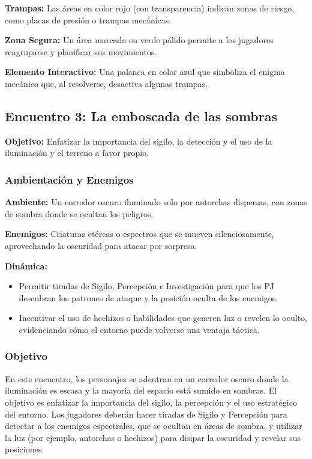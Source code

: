 \documentclass[
  twocolumn]{article}
\providecommand{\tightlist}{%
  \setlength{\itemsep}{0pt}\setlength{\parskip}{0pt}}
\begin{document}
\textbf{Trampas:} Las áreas en color rojo (con transparencia) indican
zonas de riesgo, como placas de presión o trampas mecánicas.

\textbf{Zona Segura:} Un área marcada en verde pálido permite a los
jugadores reagruparse y planificar sus movimientos.

\textbf{Elemento Interactivo:} Una palanca en color azul que simboliza
el enigma mecánico que, al resolverse, desactiva algunas trampas.

\subsection{Encuentro 3: La emboscada de las
sombras}\label{encuentro-3-la-emboscada-de-las-sombras}

\textbf{Objetivo:} Enfatizar la importancia del sigilo, la detección y
el uso de la iluminación y el terreno a favor propio.

\subsubsection{Ambientación y
Enemigos}\label{ambientaciuxf3n-y-enemigos-1}

\textbf{Ambiente:} Un corredor oscuro iluminado solo por antorchas
dispersas, con zonas de sombra donde se ocultan los peligros.

\textbf{Enemigos:} Criaturas etéreas o espectros que se mueven
silenciosamente, aprovechando la oscuridad para atacar por sorpresa.

\textbf{Dinámica:}

\begin{itemize}
\tightlist
\item
  Permitir tiradas de Sigilo, Percepción e Investigación para que los PJ
  descubran los patrones de ataque y la posición oculta de los enemigos.
\item
  Incentivar el uso de hechizos o habilidades que generen luz o revelen
  lo oculto, evidenciando cómo el entorno puede volverse una ventaja
  táctica.
\end{itemize}

\subsubsection{Objetivo}\label{objetivo-2}

En este encuentro, los personajes se adentran en un corredor oscuro
donde la iluminación es escasa y la mayoría del espacio está sumido en
sombras. El objetivo es enfatizar la importancia del sigilo, la
percepción y el uso estratégico del entorno. Los jugadores deberán hacer
tiradas de Sigilo y Percepción para detectar a los enemigos espectrales,
que se ocultan en áreas de sombra, y utilizar la luz (por ejemplo,
antorchas o hechizos) para disipar la oscuridad y revelar sus
posiciones.
\end{document}
